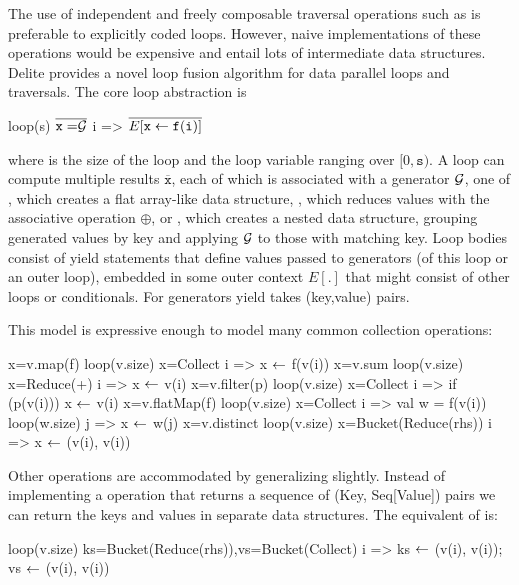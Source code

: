 The use of independent and freely composable traversal operations such as
 is preferable to explicitly coded loops. However, naive
implementations of these operations would be expensive and entail lots of
intermediate data structures.  Delite provides a novel loop fusion algorithm for
data parallel loops and traversals. The core loop abstraction is
\begin{listing}
  loop(s) $\overline{\mathtt{{x=}}\G}$ { i => $\overline{E[ \mathtt{x} \yield \mathtt{f(i)} ]}$ }
\end{listing}
where  is the size of the loop and  the loop
variable ranging over $[0,\mathtt{s})$. A loop can compute
multiple results $\overline{\mathtt{x}}$, each of which is associated
with a generator $\mathcal{G}$, one of , which creates a flat array-like
data structure, , which reduces values with
the associative operation $\oplus$, or , which
creates a nested data structure, grouping generated values by key
and applying $\mathcal{G}$ to those with matching key. Loop bodies consist
of yield statements  that define values
passed to generators (of this loop or an outer loop), embedded
in some outer context $E[.]$ that might consist of other loops
or conditionals. For  generators yield takes
(key,value) pairs.

This model is expressive enough to model many common collection
operations:
\begin{listing}
x=v.map(f)     loop(v.size) x=Collect { i => x $\yield$ f(v(i)) }
x=v.sum        loop(v.size) x=Reduce(+) { i =>  x $\yield$ v(i) }
x=v.filter(p)  loop(v.size) x=Collect { i => if (p(v(i))) 
                                                x $\yield$ v(i) }
x=v.flatMap(f) loop(v.size) x=Collect { i => val w = f(v(i))
                         loop(w.size) { j => x $\yield$ w(j) }}
x=v.distinct   loop(v.size) x=Bucket(Reduce(rhs)) { i => 
                                        x $\yield$ (v(i), v(i)) }
\end{listing}
Other operations are accommodated by generalizing slightly. Instead of
implementing a  operation that returns a sequence of
(Key, Seq[Value]) pairs we can return the keys and
values in separate data structures. The equivalent of 
is:
\begin{listing}
loop(v.size) ks=Bucket(Reduce(rhs)),vs=Bucket(Collect) { i => 
  ks $\yield$ (v(i), v(i)); vs $\yield$ (v(i), v(i)) }
\end{listing}

